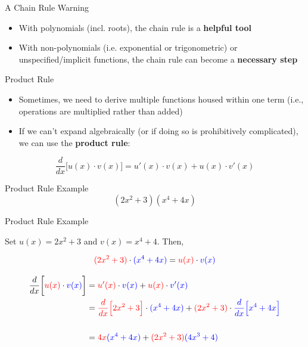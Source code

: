 \documentclass[10pt]{beamer}
\begin{document}
\begin{frame}{A Chain Rule Warning}
    \begin{itemize}
        \item With polynomials (incl. roots), the chain rule is a \textbf{helpful tool}
        \item With non-polynomials (i.e. exponential or trigonometric) or unspecified/implicit functions, the chain rule can become a \textbf{necessary step}
    \end{itemize}
\end{frame}

\begin{frame}{Product Rule}
    \begin{itemize}
        \item Sometimes, we need to derive multiple functions housed within one term (i.e., operations are multiplied rather than added)
        \item If we can't expand algebraically (or if doing so is prohibitively complicated), we can use the \textbf{product rule}:
    \end{itemize}

    \[\frac{d}{dx} \bigg[ u(x) \cdot v(x) \bigg] = u'(x) \cdot v(x) + u(x) \cdot v'(x)\]
\end{frame}

\begin{frame}{Product Rule Example}
    \[(2x^2 + 3)(x^4 + 4x)\]

    
\end{frame}

\begin{frame}{Product Rule Example}

    Set $u(x) = 2x^2 + 3$ and $v(x) = x^4 + 4$. Then,

    \[\textcolor{red}{(2x^2 + 3)} \cdot \textcolor{blue}{(x^4 + 4x)} = \textcolor{red}{u(x)} \cdot \textcolor{blue}{v(x)}\]
    
    \begin{align*}
    \frac{d}{dx} \bigg[\textcolor{red}{u(x)} \cdot \textcolor{blue}{v(x)} \bigg] &= \textcolor{red}{u'(x)} \cdot \textcolor{blue}{v(x)} + \textcolor{red}{u(x)} \cdot \textcolor{blue}{v'(x)} \\ &= \textcolor{red}{\frac{d}{dx}\Big[ 2x^2 + 3\Big]} \cdot \textcolor{blue}{(x^4 + 4x)} + \textcolor{red}{(2x^2 + 3)} \cdot \textcolor{blue}{\frac{d}{dx} \Big[ x^4 + 4x\Big]} \\ \\
    &= \textcolor{red}{4x}\textcolor{blue}{(x^4  + 4x)} + \textcolor{red}{(2x^2 + 3)}\textcolor{blue}{(4x^3 + 4)}
    \end{align*}

\end{frame}
\end{document}

